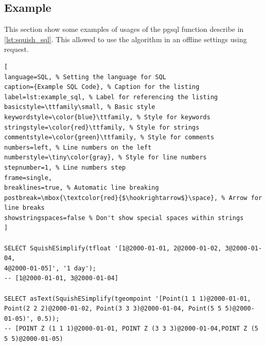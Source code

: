 \subsection{Example}
This section show some examples of usages of the pgsql function describe in \ref{lst:squish_sql}. This allowed to use the algorithm in an offline settings using request.
\begin{lstlisting}[
language=SQL, % Setting the language for SQL
caption={Example SQL Code}, % Caption for the listing
label=lst:example_sql, % Label for referencing the listing
basicstyle=\ttfamily\small, % Basic style
keywordstyle=\color{blue}\ttfamily, % Style for keywords
stringstyle=\color{red}\ttfamily, % Style for strings
commentstyle=\color{green}\ttfamily, % Style for comments
numbers=left, % Line numbers on the left
numberstyle=\tiny\color{gray}, % Style for line numbers
stepnumber=1, % Line numbers step
frame=single,
breaklines=true, % Automatic line breaking
postbreak=\mbox{\textcolor{red}{$\hookrightarrow$}\space}, % Arrow for line breaks
showstringspaces=false % Don't show special spaces within strings
]

SELECT SquishESimplify(tfloat '[1@2000-01-01, 2@2000-01-02, 3@2000-01-04,
4@2000-01-05]', '1 day');
-- [1@2000-01-01, 3@2000-01-04]

SELECT asText(SquishESimplify(tgeompoint '[Point(1 1 1)@2000-01-01,
Point(2 2 2)@2000-01-02, Point(3 3 3)@2000-01-04, Point(5 5 5)@2000-01-05)', 0.5));
-- [POINT Z (1 1 1)@2000-01-01, POINT Z (3 3 3)@2000-01-04,POINT Z (5 5 5)@2000-01-05)

\end{lstlisting}
